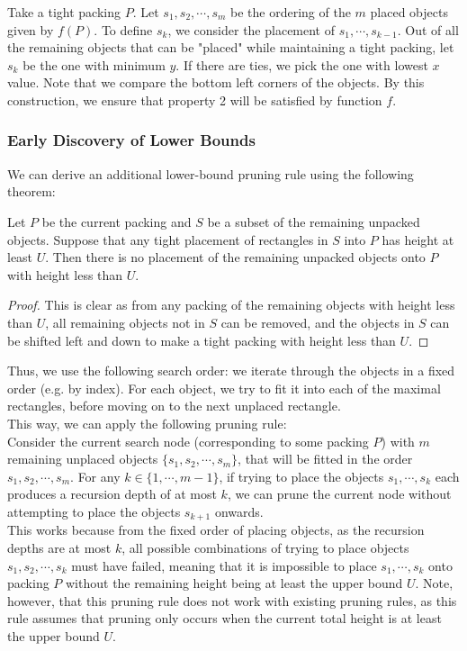 \documentclass{article}
\begin{document}
Take a tight packing $P$. Let $s_1,s_2,\cdots,s_m$ be the ordering of the $m$ placed objects given by $f(P)$. To define $s_k$, we consider the placement of $s_1,\cdots,s_{k-1}$. Out of all the remaining objects that can be "placed" while maintaining a tight packing, let $s_k$ be the one with minimum $y$. If there are ties, we pick the one with lowest $x$ value. Note that we compare the bottom left corners of the objects. By this construction, we ensure that property 2 will be satisfied by function $f$.

\subsubsection{Early Discovery of Lower Bounds}
We can derive an additional lower-bound pruning rule using the following theorem:

\begin{thm}
Let $P$ be the current packing and $S$ be a subset of the remaining unpacked objects. Suppose that any tight placement of rectangles in $S$ into $P$ has height at least $U$. Then there is no placement of the remaining unpacked objects onto $P$ with height less than $U$.
\end{thm}
\begin{proof}
This is clear as from any packing of the remaining objects with height less than $U$, all remaining objects not in $S$ can be removed, and the objects in $S$ can be shifted left and down to make a tight packing with height less than $U$.
\end{proof}

Thus, we use the following search order: we iterate through the objects in a fixed order (e.g. by index). For each object, we try to fit it into each of the maximal rectangles, before moving on to the next unplaced rectangle.\\

This way, we can apply the following pruning rule:\\
Consider the current search node (corresponding to some packing $P$) with $m$ remaining unplaced objects $\{s_1,s_2,\cdots,s_m\}$, that will be fitted in the order $s_1,s_2,\cdots,s_m$. For any $k \in \{1,\cdots,m-1\}$, if trying to place the objects $s_1,\cdots,s_k$ each produces a recursion depth of at most $k$, we can prune the current node without attempting to place the objects $s_{k+1}$ onwards.\\

This works because from the fixed order of placing objects, as the recursion depths are at most $k$, all possible combinations of trying to place objects $s_1,s_2,\cdots,s_k$ must have failed, meaning that it is impossible to place $s_1,\cdots,s_k$ onto packing $P$ without the remaining height being at least the upper bound $U$. Note, however, that this pruning rule does not work with existing pruning rules, as this rule assumes that pruning only occurs when the current total height is at least the upper bound $U$.\\
\end{document}
